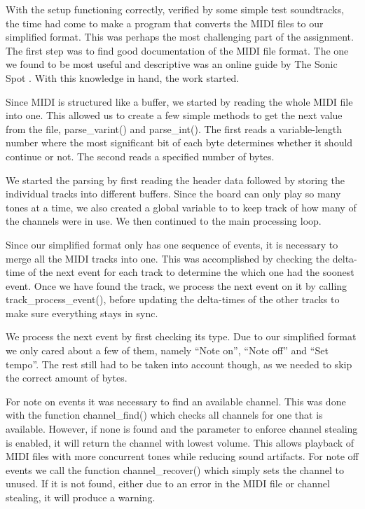 \documentclass[a4paper,12pt]{article}
\begin{document}
With the setup functioning correctly, verified by some simple test soundtracks, the time had come to make a program that converts the MIDI files to our simplified format. This was perhaps the most challenging part of the assignment. The first step was to find good documentation of the MIDI file format. The one we found to be most useful and descriptive was an online guide by The Sonic Spot \cite{sonicspot}. With this knowledge in hand, the work started.

Since MIDI is structured like a buffer, we started by reading the whole MIDI file into one. This allowed us to create a few simple methods to get the next value from the file, parse\_varint() and parse\_int(). The first reads a variable-length number where the most significant bit of each byte determines whether it should continue or not. The second reads a specified number of bytes.

We started the parsing by first reading the header data followed by storing the individual tracks into different buffers. Since the board can only play so many tones at a time, we also created a global variable to to keep track of how many of the channels were in use. We then continued to the main processing loop.

Since our simplified format only has one sequence of events, it is necessary to merge all the MIDI tracks into one. This was accomplished by checking the delta-time of the next event for each track to determine the which one had the soonest event. Once we have found the track, we process the next event on it by calling track\_process\_event(), before updating the delta-times of the other tracks to make sure everything stays in sync.

We process the next event by first checking its type. Due to our simplified format we only cared about a few of them, namely “Note on”, “Note off” and “Set tempo”. The rest still had to be taken into account though, as we needed to skip the correct amount of bytes.

For note on events it was necessary to find an available channel. This was done with the function channel\_find() which checks all channels for one that is available. However, if none is found and the parameter to enforce channel stealing is enabled, it will return the channel with lowest volume. This allows playback of MIDI files with more concurrent tones while reducing sound artifacts. For note off events we call the function channel\_recover() which simply sets the channel to unused. If it is not found, either due to an error in the MIDI file or channel stealing, it will produce a warning.
\end{document}
